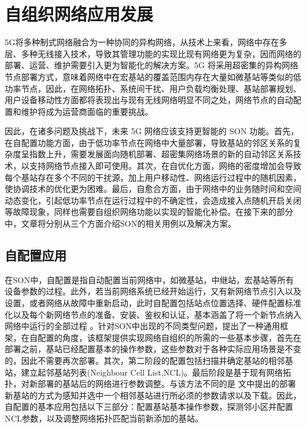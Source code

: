 ﻿\documentclass[11pt,draftclsnofoot,onecolumn,journal,letterpaper]{IEEEtran}
\begin{document}
\section{自组织网络应用发展}
\label{sec:SON}
5G将多种制式网络融合为一种协同的异构网络，从技术上来看，网络中存在多层、多种无线接入技术，导致其管理功能的实现比现有网络更为复杂，因而网络的部署、运营、维护需要引入更为智能化的解决方案。5G 将采用超密集的异构网络节点部署方式，意味着网络中在宏基站的覆盖范围内存在大量如微基站等类似的低功率节点\cite{Moysen2017}，因此，在网络拓扑、系统间干扰、用户负载均衡处理、基站部署规划、用户设备移动性方面都将表现出与现有无线网络明显不同之处，网络节点的自动配置和维护将成为运营商面临的重要挑战。

因此，在诸多问题及挑战下，未来 5G 网络应该支持更智能的 SON 功能\cite{Imran2014}。首先，在自配置功能方面，由于低功率节点在网络中大量部署，导致基站的邻区关系的复杂度呈指数上升，需要发展面向随机部署、超密集网络场景的新的自动邻区关系技术，以支持网络节点接入即可使用。其次，在自优化方面，网络的密度增加会导致每个基站存在多个不同的干扰源，加上用户移动性、网络运行过程中的随机因素， 使协调技术的优化更为困难。最后，自愈合方面，由于网络中的业务随时间和空间动态变化，引起低功率节点在运行过程中的不确定性，会造成接入点随机开启关闭等故障现象，同样也需要自组织网络功能以实现的智能化补偿。在接下来的部分中，文章将分别从三个方面介绍SON的相关用例以及解决方案。
\subsection{自配置应用}
\label{sec:self-configuration}

在SON中，自配置是指自动配置当前网络中，如微基站，中继站，宏基站等所有设备参数的过程。此外，若当前网络系统已经开始运行，又有新网络节点引入以及设置，或者网络从故障中重新启动，此时自配置包括站点位置选择、硬件配置标准化以及每个新网络节点的准备、安装、鉴权和认证，基本涵盖了将一个新节点纳入网络中运行的全部过程 \cite{Aliu2013}。针对SON中出现的不同类型问题，\cite{Wainio2016}提出了一种通用框架，在自配置的角度，该框架提供实现网络自组织的所需的一些基本步骤，首先在部署之前，基站已经配置基本的操作参数，这些参数对于各种实际应用场景是不变的，因此不需要再次部署。其次，第二阶段的配置包括扫描并确定基站的相邻基站，建立起邻基站列表(Neighbour Cell List,NCL)。最后阶段是基于现有网络拓扑，对新部署的基站后的网络进行参数调整。与该方法不同的是 \cite{Hu2010}文中提出的部署新基站的方式为感知并选中一个相邻基站进行所必须的参数请求以及下载。因此，自配置的基本应用包括以下三部分：配置基站基本操作参数，探测邻小区并配置NCL参数，以及调整网络拓扑匹配当前新添加的基站。
\end{document}
